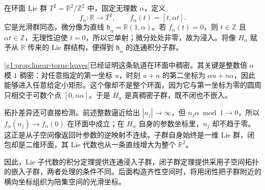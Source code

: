 \begin{example}\label{g1:exm:irrational-torus-subgroup}
	在环面 Lie 群 \(T^2=\mathbb R^2/\mathbb Z^2\) 中，固定无理数 \(\alpha\)，定义
	\[
		f_\alpha:\mathbb R\longrightarrow T^2,\qquad
		f_\alpha(t)=[t,\alpha t].
	\]
	它是光滑群同态，微分像为直线 \(\mathfrak h_\alpha=\mathbb R(1,\alpha)\)。若 \(f_\alpha(t)=0\)，则 \(t\in\mathbb Z\) 且 \(\alpha t\in\mathbb Z\)，无理性迫使 \(t=0\)，所以它单射；微分处处非零，故为浸入。将像 \(H_\alpha\) 赋予从 \(\mathbb R\) 传来的 Lie 群结构，便得到 \(\mathfrak h_\alpha\) 的连通积分子群。

	\cref{g1:prop:linear-torus-leaves}已经证明这条轨道在环面中稠密。其关键是整数倍 \(\alpha\) 模 \(1\) 稠密：对任意指定的第一坐标 \(u\)，时刻 \(u+n\) 的第二坐标为 \(\alpha u+n\alpha\)，因此能够进入任意给定小矩形。这个像却不是整个环面，因为它与第一坐标为零的圆周只相交于可数个点 \([0,n\alpha]\)。于是 \(H_\alpha\) 是真稠密子群，既不闭也不嵌入。

	拓扑差异还可直接检测。前述整数逼近给出 \(|n_j|\to\infty\)，但 \(n_j\alpha\bmod1\to0\)，所以 \(f_\alpha(n_j)\to f_\alpha(0)\) 在环面中成立；在 \(H_\alpha\) 自身的参数坐标里，\(n_j\) 却不趋于零。这正是从子空间像返回叶参数的逆映射不连续。子群自身始终是一维 Lie 群，闭包却是二维环面，其 Lie 代数也从一条直线增大为整个 \(\mathbb R^2\)。
\end{example}

因此，Lie 子代数的积分定理提供连通浸入子群，闭子群定理提供采用子空间拓扑的嵌入子群，两者处理的条件不同。后面构造齐性空间时，将用闭性把子群附近的横向坐标组织为陪集空间的光滑坐标。

